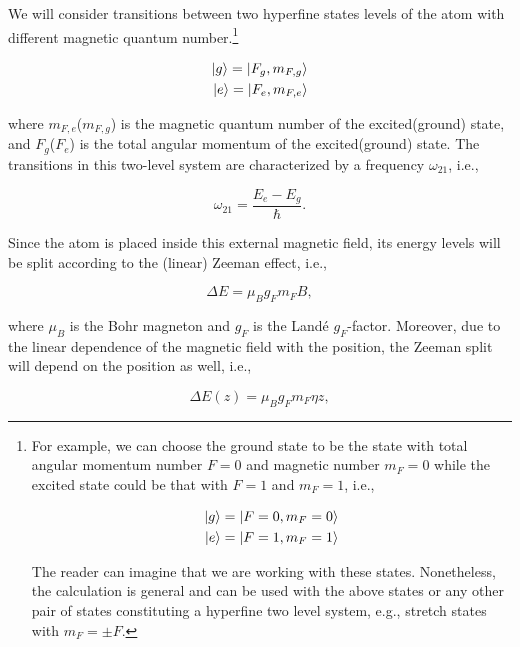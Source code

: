 \documentclass{article}
\begin{document}
We will consider transitions between two hyperfine states levels of the atom with different magnetic quantum number.\footnote{For example, we can choose the ground state to be the state with total angular momentum number $F=0$ and magnetic number $m_{F}=0$ while the excited state could be that with $F=1$ and $m_{F}=1$, i.e.,

\begin{equation}
\begin{aligned}
\ket{g} = \ket{F=0, m_{F}=0} \\
\ket{e} = \ket{F=1, m_{F}=1}
\end{aligned}
\end{equation}

The reader can imagine that we are working with these states. Nonetheless, the calculation is general and can be used with the above states or any other pair of states constituting a hyperfine two level system, e.g., stretch states with $m_{F}=\pm F$.}

\begin{equation}\label{hyperfine_levels}
\begin{aligned}
\ket{g} = \ket{F_{g}, m_{F, g}} \\
\ket{e} = \ket{F_{e}, m_{F, e}}
\end{aligned}
\end{equation}

where $m_{F, e}$($m_{F, g}$) is the magnetic quantum number of the excited(ground) state, and $F_{g}$($F_{e}$) is the total angular momentum of the excited(ground) state.
The transitions in this two-level system are characterized by a frequency  $\omega_{21}$, i.e.,

\begin{equation}
  \omega_{21} = \frac{E_{e}-E_{g}}{\hbar}.
\end{equation}

Since the atom is placed inside this external magnetic field, its energy levels will be split according to the (linear) Zeeman effect, i.e.,

\begin{equation}
  \Delta E = \mu_{B} g_{F} m_{F} B,
\end{equation}

where $\mu_{B}$ is the Bohr magneton and $g_{F}$ is the Landé $g_{F}$-factor. Moreover, due to the linear dependence of the magnetic field with the position, the Zeeman split will depend on the position as well, i.e.,

\begin{equation}
  \Delta E(z) = \mu_{B} g_{F} m_{F} \eta z,
\end{equation}
\end{document}
